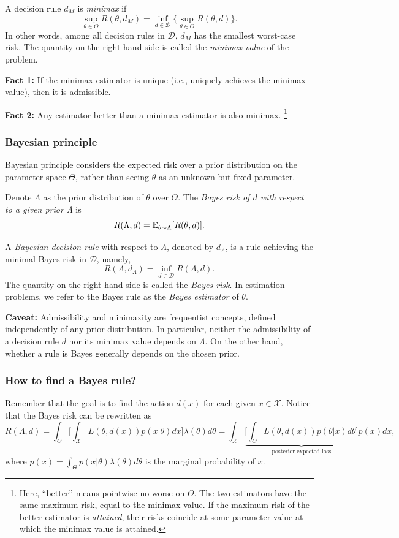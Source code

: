 A decision rule $d_M$ is \emph{minimax} if
\[
\sup_{\theta \in \Theta} R(\theta, d_M) = \inf_{d \in \mathcal{D}} \{\sup_{\theta \in \Theta} R(\theta, d)\}.
\]
In other words, among all decision rules in $\mathcal{D}$, $d_M$ has the smallest worst-case risk. The quantity on the right hand side is called the \emph{minimax value} of the problem.

\begin{mybox}
    \textbf{Fact 1:} If the minimax estimator is unique (i.e., uniquely achieves the minimax value), then it is admissible.
    
    \textbf{Fact 2:} Any estimator better than a minimax estimator is also minimax.
    \footnote{Here, ``better'' means pointwise no worse on $\Theta$. The two estimators have the same maximum risk, equal to the minimax value. If the maximum risk of the better estimator is \emph{attained}, their risks coincide at some parameter value at which the minimax value is attained.}
\end{mybox}

\subsubsection{Bayesian principle}
Bayesian principle considers the expected risk over a prior distribution on the parameter space $\Theta$, rather than seeing $\theta$ as an unknown but fixed parameter.


Denote $\Lambda$ as the prior distribution of $\theta$ over $\Theta$. The \emph{Bayes risk of $d$ with respect to a given prior $\Lambda$} is 
\[
R(\Lambda, d) = \mathbb{E}_{\theta \sim \Lambda}[R(\theta, d)].
\]

A \emph{Bayesian decision rule} with respect to $\Lambda$, denoted by $d_\Lambda$, is a rule achieving the minimal Bayes risk in $\mathcal{D}$, namely,
\[R(\Lambda, d_\Lambda) = \inf_{d\in \mathcal{D}} R(\Lambda, d).\]
The quantity on the right hand side is called the \emph{Bayes risk}. In estimation problems, we refer to the Bayes rule as the \emph{Bayes estimator} of $\theta$.

\textbf{Caveat:} Admissibility and minimaxity are frequentist concepts, defined independently of any prior distribution. In particular, neither the admissibility of a decision rule $d$ nor its minimax value depends on $\Lambda$. On the other hand, whether a rule is Bayes generally depends on the chosen prior.

\subsubsection{How to find a Bayes rule?}
Remember that the goal is to find the action $d(x)$ for each given $x\in \mathcal{X}$. Notice that the Bayes risk can be rewritten as
\[
R(\Lambda, d) 
= \int_\Theta 
\Big[ \int_\mathcal{X} L(\theta, d(x)) p(x|\theta) dx \Big]
\lambda(\theta) d\theta
= \int_\mathcal{X} 
\underbrace{\Big[\int_\Theta L(\theta, d(x)) p(\theta|x) d\theta \Big]}_{\text{posterior expected loss}}
p(x) dx,
\]
where $p(x) = \int_\Theta p(x|\theta) \lambda(\theta) d\theta$ is the marginal probability of $x$.

